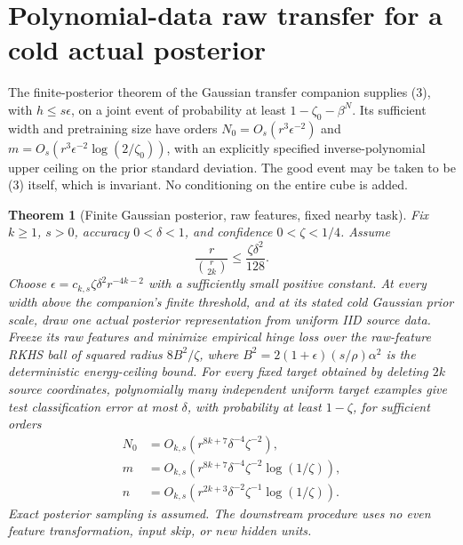 \documentclass[11pt]{article}
\newtheorem{theorem}{Theorem}\newtheorem{lemma}[theorem]{Lemma}
\begin{document}
\section{Polynomial-data raw transfer for a cold actual posterior}
The finite-posterior theorem of the Gaussian transfer companion supplies
(3), with $h\le s\epsilon$, on a joint event of probability at least
$1-\zeta_0-\beta^N$. Its sufficient width and pretraining size have orders
$N_0=O_s(r^3\epsilon^{-2})$ and
$m=O_s(r^3\epsilon^{-2}\log(2/\zeta_0))$, with an explicitly specified
inverse-polynomial upper ceiling on the prior standard deviation.
The good event may be taken to be (3) itself, which is invariant.
No conditioning on the entire cube is added.

\begin{theorem}[Finite Gaussian posterior, raw features, fixed nearby task]
Fix $k\ge1$, $s>0$, accuracy $0<\delta<1$, and confidence
$0<\zeta<1/4$. Assume
\[
       \frac r{\binom r{2k}}\le\frac{\zeta\delta^2}{128}.
 \tag{9}
\]
Choose $\epsilon=c_{k,s}\zeta\delta^2r^{-4k-2}$ with a sufficiently
small positive constant. At every width above the companion's finite
threshold, and at its stated cold Gaussian prior scale, draw one actual
posterior representation from uniform IID source data. Freeze its raw
features and minimize empirical hinge loss over the raw-feature RKHS
ball of squared radius $8B^2/\zeta$, where
$B^2=2(1+\epsilon)(s/\rho)\alpha^2$ is the deterministic energy-ceiling bound.
For every fixed target obtained by deleting $2k$ source coordinates,
polynomially many independent uniform target examples give test
classification error at most $\delta$, with probability at least
$1-\zeta$, for sufficient orders
\[
 \begin{split}
 N_0&=O_{k,s}(r^{8k+7}\delta^{-4}\zeta^{-2}),\\
 m&=O_{k,s}(r^{8k+7}\delta^{-4}\zeta^{-2}\log(1/\zeta)),\\
 n&=O_{k,s}(r^{2k+3}\delta^{-2}\zeta^{-1}\log(1/\zeta)).
 \end{split}                                                   \tag{10}
\]
Exact posterior sampling is assumed. The downstream procedure uses no
even feature transformation, input skip, or new hidden units.
\end{theorem}
\end{document}
